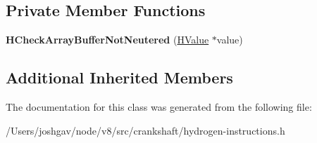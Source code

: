 \subsection*{Private Member Functions}
\begin{DoxyCompactItemize}
\item 
{\bfseries H\+Check\+Array\+Buffer\+Not\+Neutered} (\hyperlink{classv8_1_1internal_1_1_h_value}{H\+Value} $\ast$value)\hypertarget{classv8_1_1internal_1_1_h_check_array_buffer_not_neutered_a89bd970f8e6932e94fe6f5fdfce7cc12}{}\label{classv8_1_1internal_1_1_h_check_array_buffer_not_neutered_a89bd970f8e6932e94fe6f5fdfce7cc12}

\end{DoxyCompactItemize}
\subsection*{Additional Inherited Members}


The documentation for this class was generated from the following file\+:\begin{DoxyCompactItemize}
\item 
/\+Users/joshgav/node/v8/src/crankshaft/hydrogen-\/instructions.\+h\end{DoxyCompactItemize}
